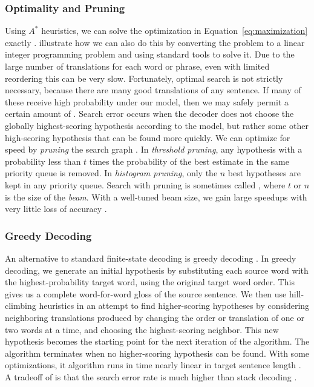 \subsubsection{Optimality and Pruning}\label{sec:optimality-and-pruning}
Using $A^*$ heuristics, we can solve the optimization in 
Equation~\ref{eq:maximization} exactly \citep{Och:2001:ddmmt}.
\citet{Germann:2004:ai} illustrate
how we can also do this by converting the problem to a linear integer
programming problem and using standard tools to solve it.  Due to
the large number of translations for each word or phrase, 
even with limited reordering this can be very slow.
Fortunately, optimal search is not strictly necessary,
because there are many good translations of 
any sentence.  If many of these receive high probability under
our model, then we may safely permit a certain amount of .
Search error occurs when the decoder does not choose the globally highest-scoring
hypothesis according to the model, but rather some other high-scoring
hypothesis that can be found more quickly.  We can optimize for speed
by {\em pruning} the search graph \citep{Tillman:2003:cl,Koehn:2004:amta}.
In {\em threshold pruning}, any hypothesis
with a probability less than $t$ times the probability of the 
best estimate in the same priority queue is removed.  In {\em histogram
pruning}, only the $n$ best hypotheses are kept in any priority queue.
Search with pruning is sometimes called ,
where $t$ or $n$ is the size of the {\em beam}.
With a well-tuned beam size, we 
gain large speedups with very little loss of accuracy
\citep{Tillman:2003:cl,Zens:2004:hlt-naacl,Koehn:2004:amta,Germann:2004:ai}.


\subsubsection{Greedy Decoding}\label{sec:greedy-decoding}
An alternative to standard finite-state decoding is 
greedy decoding \citep{Marcu:2002:emnlp,Germann:2003:naacl,Germann:2004:ai}.
In greedy decoding, we generate an initial hypothesis
by substituting each source word with the 
highest-probability target word, using the
original target word order.  This gives us a complete word-for-word
gloss of the source sentence.  We then use hill-climbing 
heuristics in an attempt to find higher-scoring hypotheses
by considering neighboring translations produced by
changing the order or translation of one or two words
at a time, and choosing the highest-scoring neighbor.
This new hypothesis becomes the starting point for
the next iteration of the algorithm. 
The algorithm terminates when 
no higher-scoring hypothesis can
be found.  With some optimizations, it algorithm runs
in time nearly linear in target sentence length 
\citep{Germann:2003:naacl}.  A tradeoff of 
is that the search error rate is 
much higher than stack decoding \citep{Germann:2004:ai}.



